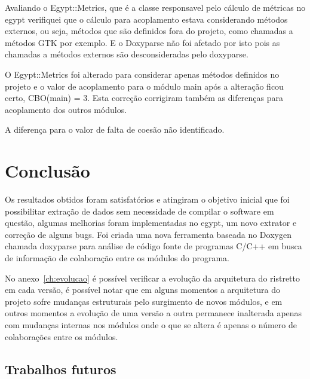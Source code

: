 Avaliando o Egypt::Metrics, que é a classe responsavel pelo cálculo de métricas no egypt verifiquei que o cálculo para acoplamento estava considerando métodos externos, ou seja, métodos que são definidos fora do projeto, como chamadas a métodos GTK por exemplo. E o Doxyparse não foi afetado por isto pois as chamadas a métodos externos são desconsideradas pelo doxyparse.

O Egypt::Metrics foi alterado para considerar apenas métodos definidos no projeto e o valor de acoplamento para o módulo main após a alteração ficou certo, CBO(main) = 3. Esta correção corrigiram também as diferenças para acoplamento dos outros módulos.

A diferença para o valor de falta de coesão não identificado.

\chapter{Conclusão} \label{ch:conclusao}

Os resultados obtidos foram satisfatórios e atingiram o objetivo inicial que
foi possibilitar extração de dados sem necessidade de compilar o software em
questão, algumas melhorias foram implementadas no egypt, um novo extrator e
correção de alguns bugs. Foi criada uma nova ferramenta baseada no Doxygen
chamada doxyparse para análise de código fonte de programas C/C++ em busca de
informação de colaboração entre os módulos do programa.

No anexo~\ref{ch:evolucao} é possível verificar a evolução da arquitetura do
ristretto em cada versão, é possível notar que em alguns momentos a arquitetura
do projeto sofre mudanças estruturais pelo surgimento de novos módulos, e em
outros momentos a evolução de uma versão a outra permanece inalterada apenas
com mudanças internas nos módulos onde o que se altera é apenas o número de
colaborações entre os módulos.

\section{Trabalhos futuros}

